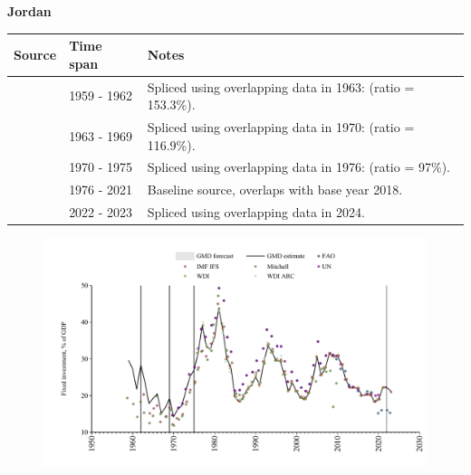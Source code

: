 \documentclass[12pt,a4paper,landscape]{article}
\begin{document}
\begin{adjustbox}{max totalsize={\paperwidth}{\paperheight},center}
\begin{minipage}[t][\textheight][t]{\textwidth}
\vspace*{0.5cm}
{}
\begin{center}
{\Large\bfseries Jordan}
\end{center}
\vspace{0.5cm}
\begin{table}[H]
\centering
\small
\begin{tabular}{|l|l|l|}
\hline
\textbf{Source} & \textbf{Time span} & \textbf{Notes} \\
\hline
\rowcolor{white}\cite{Mitchell}& 1959 - 1962 &Spliced using overlapping data in 1963: (ratio = 153.3\%).\\
\rowcolor{lightgray}\cite{IMF_IFS}& 1963 - 1969 &Spliced using overlapping data in 1970: (ratio = 116.9\%).\\
\rowcolor{white}\cite{UN}& 1970 - 1975 &Spliced using overlapping data in 1976: (ratio = 97\%).\\
\rowcolor{lightgray}\cite{WDI}& 1976 - 2021 &Baseline source, overlaps with base year 2018.\\
\rowcolor{white}\cite{IMF_IFS}& 2022 - 2023 &Spliced using overlapping data in 2024.\\
\hline
\end{tabular}
\end{table}
\begin{figure}[H]
\centering
\includegraphics[width=\textwidth,height=0.6\textheight,keepaspectratio]{graphs/JOR_finv_GDP.pdf}
\end{figure}
\end{minipage}
\end{adjustbox}
\end{document}
